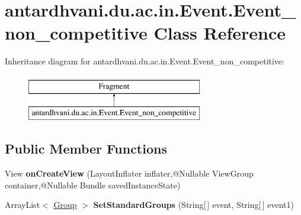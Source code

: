 \hypertarget{classantardhvani_1_1du_1_1ac_1_1in_1_1_event_1_1_event__non__competitive}{}\section{antardhvani.\+du.\+ac.\+in.\+Event.\+Event\+\_\+non\+\_\+competitive Class Reference}
\label{classantardhvani_1_1du_1_1ac_1_1in_1_1_event_1_1_event__non__competitive}
Inheritance diagram for antardhvani.\+du.\+ac.\+in.\+Event.\+Event\+\_\+non\+\_\+competitive\+:\begin{figure}[H]
\begin{center}
\leavevmode
\includegraphics[height=2.000000cm]{classantardhvani_1_1du_1_1ac_1_1in_1_1_event_1_1_event__non__competitive}
\end{center}
\end{figure}
\subsection*{Public Member Functions}
\begin{DoxyCompactItemize}
\item 
\hypertarget{classantardhvani_1_1du_1_1ac_1_1in_1_1_event_1_1_event__non__competitive_a729cbba86f8ee10b6a7e39d1ca0adf4f}{}View {\bfseries on\+Create\+View} (Layout\+Inflater inflater,@Nullable View\+Group container,@Nullable Bundle saved\+Instance\+State)\label{classantardhvani_1_1du_1_1ac_1_1in_1_1_event_1_1_event__non__competitive_a729cbba86f8ee10b6a7e39d1ca0adf4f}

\item 
\hypertarget{classantardhvani_1_1du_1_1ac_1_1in_1_1_event_1_1_event__non__competitive_a5220e87c7fd1f0f5326b25bf36d852bc}{}Array\+List$<$ \hyperlink{classantardhvani_1_1du_1_1ac_1_1in_1_1_adapter_1_1_group}{Group} $>$ {\bfseries Set\+Standard\+Groups} (String\mbox{[}$\,$\mbox{]} event, String\mbox{[}$\,$\mbox{]} event1)\label{classantardhvani_1_1du_1_1ac_1_1in_1_1_event_1_1_event__non__competitive_a5220e87c7fd1f0f5326b25bf36d852bc}

\end{DoxyCompactItemize}
